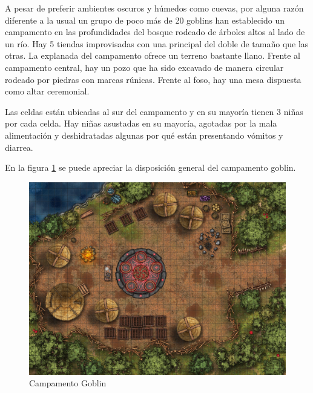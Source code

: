 \documentclass[10pt,twoside,twocolumn,openany]{dndbook}
\begin{document}
A pesar de preferir ambientes oscuros y húmedos como cuevas, por alguna razón diferente a la usual 
un grupo de poco más de 20 goblins han establecido un campamento en las profundidades del bosque rodeado de 
árboles altos al lado de un río. Hay 5 tiendas improvisadas con una principal del doble de tamaño que 
las otras. La explanada del campamento ofrece un terreno bastante llano. Frente al campamento central, 
hay un pozo que ha sido excavado de manera circular rodeado por piedras con marcas rúnicas. 
Frente al foso, hay una mesa dispuesta como altar ceremonial.

Las celdas están ubicadas al sur del campamento y en su mayoría tienen 3 niñas por cada celda. Hay 
niñas asustadas en su mayoría, agotadas por la mala alimentación y deshidratadas algunas por qué 
están presentando vómitos y diarrea.

En la figura \ref{fig:camp1} se puede apreciar la disposición general del campamento goblin.

\begin{figure}[hb!]
  \centering
  \includegraphics[width=\textwidth]{maps/goblin-camp.jpg}
  \caption{Campamento Goblin}
  \label{fig:camp1}
\end{figure}
\end{document}
